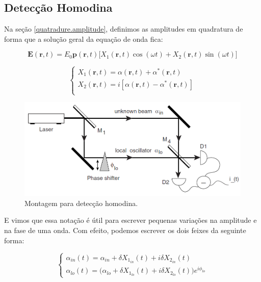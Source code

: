 \subsection{Detecção Homodina}

Na seção \ref{quatradure.amplitude}, definimos as amplitudes em quadratura de forma que a solução geral da equação de onda fica:

\begin{equation}
    \textbf{E}(\textbf{r},t)=E_0\textbf{p}(\textbf{r},t)\bigl[X_1(\textbf{r},t)\cos(\omega t)+X_2(\textbf{r},t)\sin(\omega t)\bigr]
\end{equation}

\begin{equation}
    \begin{cases}
        X_1(\textbf{r},t)=\alpha(\textbf{r},t)+\alpha^*(\textbf{r},t)\\
        X_2(\textbf{r},t)=i[\alpha(\textbf{r},t)-\alpha^*(\textbf{r},t)]\\
    \end{cases}
\end{equation}

\begin{figure}[H]
    \centering
    \includegraphics[width=1.0\linewidth]{homodyne detection.png}
    \caption{Montagem para detecção homodina.}
    \label{homodyne.detection}
\end{figure}

E vimos que essa notação é útil para escrever pequenas variações na amplitude e na fase de uma onda. Com efeito, podemos escrever os dois feixes da seguinte forma:

\begin{equation}
    \begin{cases}
        \alpha_{in}(t)=\alpha_{in}+\delta X_1_{in}(t)+i\delta X_2_{in}(t)\\
        \alpha_{lo}(t)=\big(\alpha_{lo}+\delta X_1_{lo}(t)+i\delta X_2_{lo}(t)\big)e^{i\phi_{lo}}
    \end{cases}
\end{equation}

